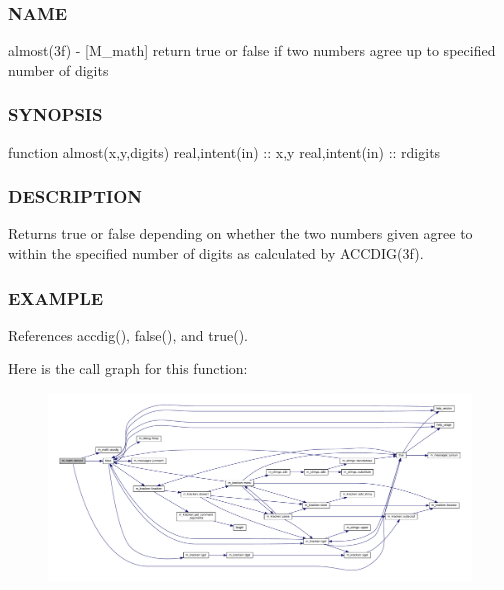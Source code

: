 \subsubsection*{N\+A\+ME}

almost(3f) -\/ \mbox{[}M\+\_\+math\mbox{]} return true or false if two numbers agree up to specified number of digits \subsubsection*{S\+Y\+N\+O\+P\+S\+IS}

function almost(x,y,digits) real,intent(in) \+:\+: x,y real,intent(in) \+:\+: rdigits \subsubsection*{D\+E\+S\+C\+R\+I\+P\+T\+I\+ON}

Returns true or false depending on whether the two numbers given agree to within the specified number of digits as calculated by A\+C\+C\+D\+I\+G(3f). \subsubsection*{E\+X\+A\+M\+P\+LE}

References accdig(), false(), and true().

Here is the call graph for this function\+:
\nopagebreak
\begin{figure}[H]
\begin{center}
\leavevmode
\includegraphics[width=350pt]{namespacem__math_a5c6526b86e62cffde2dc20e53fd3be22_cgraph}
\end{center}
\end{figure}
\mbox{\label{namespacem__math_a5298e196ca91a45fd9cff36e1b8e188a}} 
